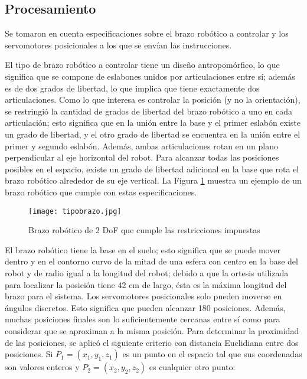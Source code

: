 \subsection{Procesamiento}

Se tomaron en cuenta especificaciones sobre el brazo robótico a controlar y los servomotores posicionales a los que se envían las instrucciones.

El tipo de brazo robótico a controlar tiene un diseño antropomórfico, lo que significa que se compone de eslabones unidos por articulaciones entre sí; además es de dos grados de libertad, lo que implica que tiene exactamente dos articulaciones. Como lo que interesa es controlar la posición (y no la orientación), se restringió la cantidad de grados de libertad del brazo robótico a uno en cada articulación; esto significa que en la unión entre la base y el primer eslabón existe un grado de libertad, y el otro grado de libertad se encuentra en la unión entre el primer y segundo eslabón. Además, ambas articulaciones rotan en un plano perpendicular al eje horizontal del robot. Para alcanzar todas las posiciones posibles en el espacio, existe un grado de libertad adicional en la base que rota el brazo robótico alrededor de su eje vertical. La Figura \ref{fig:tipobrazo} muestra un ejemplo de un brazo robótico que cumple con estas especificaciones.

\begin{figure}[htb]
	\centering
	\texttt{[image: tipobrazo.jpg]}
	\caption{Brazo robótico de 2 DoF que cumple las restricciones impuestas}
	\label{fig:tipobrazo}
\end{figure}

El brazo robótico tiene la base en el suelo; esto significa que se puede mover dentro y en el contorno curvo de la mitad de una esfera con centro en la base del robot y de radio igual a la longitud del robot; debido a que la ortesis utilizada para localizar la posición tiene 42 cm de largo, ésta es la máxima longitud del brazo para el sistema. Los servomotores posicionales solo pueden moverse en ángulos discretos. Esto significa que pueden alcanzar 180 posiciones. Además, muchas posiciones finales son lo suficientemente cercanas entre sí como para considerar que se aproximan a la misma posición.  Para determinar la proximidad de las posiciones, se aplicó el siguiente criterio con distancia Euclidiana entre dos posiciones. Si $P_1 = (x_1, y_1, z_1)$ es un punto en el espacio tal que sus coordenadas son valores enteros y $P_2 = (x_2, y_2, z_2)$ es cualquier otro punto:

